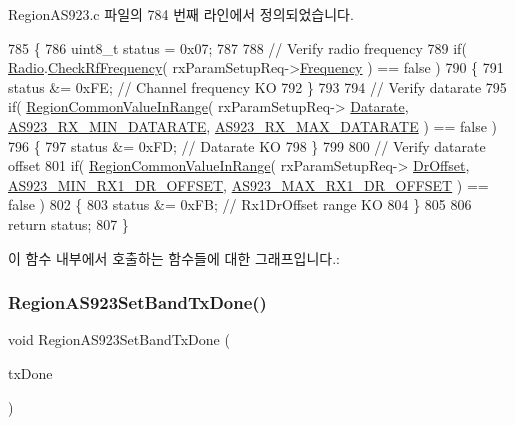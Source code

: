 Region\+A\+S923.\+c 파일의 784 번째 라인에서 정의되었습니다.


\begin{DoxyCode}
785 \{
786     uint8\_t status = 0x07;
787 
788     \textcolor{comment}{// Verify radio frequency}
789     \textcolor{keywordflow}{if}( \mbox{\hyperlink{sx1276mb1las_8c_acf9fe61a72c16fa29a0dc449d23e3820}{Radio}}.\mbox{\hyperlink{struct_radio__s_a984f224d5ef26fb8a35f77d664f384df}{CheckRfFrequency}}( rxParamSetupReq->\mbox{\hyperlink{structs_rx_param_setup_req_params_ade3d190636488dad9a89b19446b7acf1}{Frequency}} ) == false )
790     \{
791         status &= 0xFE; \textcolor{comment}{// Channel frequency KO}
792     \}
793 
794     \textcolor{comment}{// Verify datarate}
795     \textcolor{keywordflow}{if}( \mbox{\hyperlink{group___r_e_g_i_o_n_c_o_m_m_o_n_gafdd1c80d953e18d755a631b72a9c3bd3}{RegionCommonValueInRange}}( rxParamSetupReq->
      \mbox{\hyperlink{structs_rx_param_setup_req_params_ae2f6080f3aa0e9485c55513ca56bb24d}{Datarate}}, \mbox{\hyperlink{group___r_e_g_i_o_n_a_s923_ga55aa4a1054571ef315043248599e1c96}{AS923\_RX\_MIN\_DATARATE}}, 
      \mbox{\hyperlink{group___r_e_g_i_o_n_a_s923_ga008298ea3d2b2444dcad3dedca7189bc}{AS923\_RX\_MAX\_DATARATE}} ) == false )
796     \{
797         status &= 0xFD; \textcolor{comment}{// Datarate KO}
798     \}
799 
800     \textcolor{comment}{// Verify datarate offset}
801     \textcolor{keywordflow}{if}( \mbox{\hyperlink{group___r_e_g_i_o_n_c_o_m_m_o_n_gafdd1c80d953e18d755a631b72a9c3bd3}{RegionCommonValueInRange}}( rxParamSetupReq->
      \mbox{\hyperlink{structs_rx_param_setup_req_params_ad920e18a48423b1eb1fe40d1b2b082d4}{DrOffset}}, \mbox{\hyperlink{group___r_e_g_i_o_n_a_s923_gaaa342c4c9e6db79d8949112c19f7422f}{AS923\_MIN\_RX1\_DR\_OFFSET}}, 
      \mbox{\hyperlink{group___r_e_g_i_o_n_a_s923_ga92034d0c71c7943562cbebd114ed6f5e}{AS923\_MAX\_RX1\_DR\_OFFSET}} ) == false )
802     \{
803         status &= 0xFB; \textcolor{comment}{// Rx1DrOffset range KO}
804     \}
805 
806     \textcolor{keywordflow}{return} status;
807 \}
\end{DoxyCode}
이 함수 내부에서 호출하는 함수들에 대한 그래프입니다.\+:
\mbox{\label{group___r_e_g_i_o_n_a_s923_ga8e986a04899f4346d7005b5ab3722298}} 
\subsubsection{\texorpdfstring{Region\+A\+S923\+Set\+Band\+Tx\+Done()}{RegionAS923SetBandTxDone()}}
{\footnotesize\ttfamily void Region\+A\+S923\+Set\+Band\+Tx\+Done (\begin{DoxyParamCaption}\item[{\mbox{\hyperlink{group___r_e_g_i_o_n_gad0524aa0673c0814a71e7a4f9cade3fc}{Set\+Band\+Tx\+Done\+Params\+\_\+t}} $\ast$}]{tx\+Done }\end{DoxyParamCaption})}



